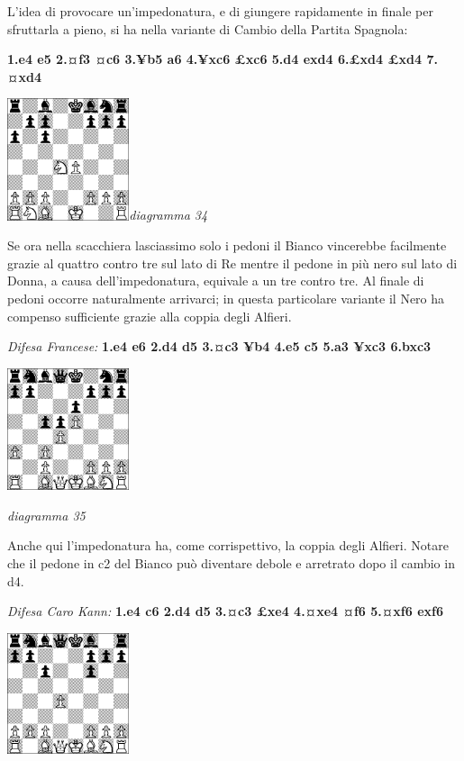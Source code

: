 \documentclass[
]{article}
\begin{document}
L'idea di provocare un'impedonatura, e di giungere rapidamente in finale
per sfruttarla a pieno, si ha nella variante di Cambio della Partita
Spagnola:

\textbf{1.e4 e5 2.¤f3 ¤c6 3.¥b5 a6 4.¥xc6 £xc6 5.d4 exd4 6.£xd4 £xd4
7.¤xd4}

\includegraphics[width=1.40972in,height=1.40972in]{vertopal_109f12be458a423d8f3cc838880eaea2/media/image34.png}\emph{diagramma
34}

Se ora nella scacchiera lasciassimo solo i pedoni il Bianco vincerebbe
facilmente grazie al quattro contro tre sul lato di Re mentre il pedone
in più nero sul lato di Donna, a causa dell'impedonatura, equivale a un
tre contro tre. Al finale di pedoni occorre naturalmente arrivarci; in
questa particolare variante il Nero ha compenso sufficiente grazie alla
coppia degli Alfieri.

\emph{Difesa Francese:} \textbf{1.e4 e6 2.d4 d5 3.¤c3 ¥b4 4.e5 c5 5.a3
¥xc3 6.bxc3}

\includegraphics[width=1.40972in,height=1.40972in]{vertopal_109f12be458a423d8f3cc838880eaea2/media/image35.png}

\emph{diagramma 35}

Anche qui l'impedonatura ha, come corrispettivo, la coppia degli
Alfieri. Notare che il pedone in c2 del Bianco può diventare debole e
arretrato dopo il cambio in d4.

\emph{Difesa Caro Kann:} \textbf{1.e4 c6 2.d4 d5 3.¤c3 £xe4 4.¤xe4 ¤f6
5.¤xf6 exf6}

\includegraphics[width=1.40139in,height=1.40139in]{vertopal_109f12be458a423d8f3cc838880eaea2/media/image36.png}
\end{document}
